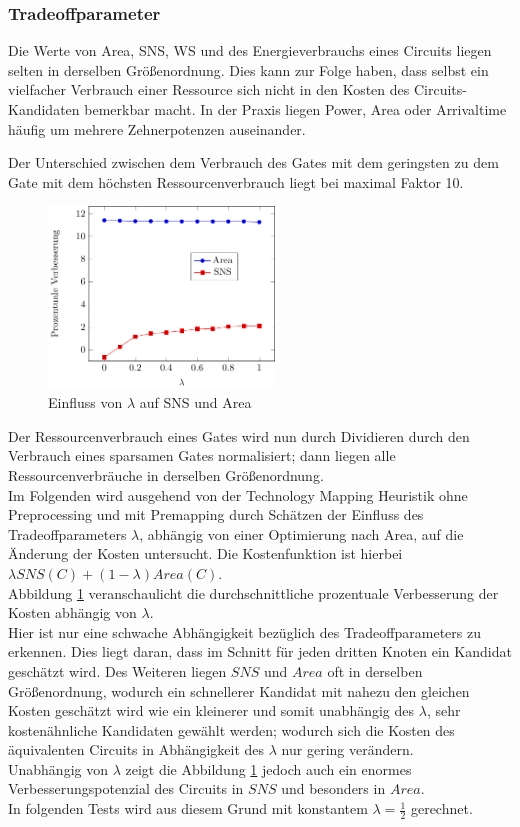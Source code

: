 \documentclass[11pt, a4paper, german]{article}
\newcommand{\TM}{Technology  Mapping }
\begin{document}
\subsubsection{Tradeoffparameter}
Die Werte von Area, SNS, WS und des Energieverbrauchs eines Circuits liegen selten in derselben Größenordnung. Dies kann zur Folge haben, dass selbst ein vielfacher Verbrauch einer Ressource sich nicht in den Kosten des Circuits-Kandidaten bemerkbar macht. In der Praxis liegen Power, Area oder Arrivaltime häufig um mehrere Zehnerpotenzen auseinander. 

Der Unterschied zwischen dem Verbrauch des Gates mit dem geringsten zu dem Gate mit dem höchsten Ressourcenverbrauch liegt bei maximal Faktor 10.

\begin{figure}
		\includegraphics[width = 6cm]{pictures/tex_files/analysis/tradeoff_curve}
		\caption{Einfluss von $\lambda$ auf SNS und Area}
		\label{bild:tradeoff_test}
\end{figure} 
Der Ressourcenverbrauch eines Gates wird nun durch Dividieren durch den Verbrauch eines sparsamen Gates normalisiert; dann liegen alle Ressourcenverbräuche  in derselben Gr\"o{\ss}enordnung. \\
Im Folgenden wird ausgehend von der \TM Heuristik ohne Preprocessing und mit Premapping durch Sch\"atzen der Einfluss des Tradeoffparameters $\lambda$, abhängig von einer Optimierung nach Area,  auf die Änderung der Kosten untersucht.  Die Kostenfunktion ist hierbei $\lambda SNS(C) + (1-\lambda)Area(C)$.\\
Abbildung \ref{bild:tradeoff_test} veranschaulicht die durchschnittliche prozentuale Verbesserung der Kosten abhängig von $\lambda$.\\


Hier ist nur eine schwache Abh\"angigkeit bez\"uglich des Tradeoffparameters zu erkennen. Dies liegt daran, dass im Schnitt f\"ur jeden dritten Knoten ein Kandidat gesch\"atzt wird. Des Weiteren liegen $SNS$ und $Area$ oft in derselben Gr\"o\ss enordnung, wodurch ein schnellerer Kandidat mit nahezu den gleichen Kosten gesch\"atzt wird wie ein kleinerer und somit unabhängig des $\lambda$, sehr kosten\"ahnliche Kandidaten gew\"ahlt werden; wodurch sich die Kosten des \"aquivalenten Circuits in Abh\"angigkeit des $\lambda$ nur gering ver\"andern.\\
Unabh\"angig von $\lambda$ zeigt die Abbildung \ref{bild:tradeoff_test} jedoch auch ein enormes Verbesserungspotenzial des Circuits in $SNS$ und besonders in $Area$.\\
In folgenden Tests wird aus diesem Grund mit konstantem $\lambda = \frac{1}{2}$ gerechnet.
\end{document}
